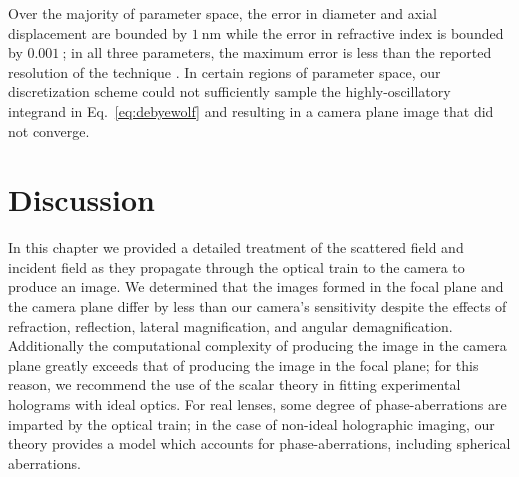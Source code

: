 Over the majority of parameter space, the error in diameter and
axial displacement are bounded by $\SI{1}{\nm}$ while the error
in refractive index is bounded by $\SI{0.001}{}$; in all three
parameters, the maximum error is less than the reported resolution of
the technique \cite{krishnatreya14}. In certain regions of parameter
space, our discretization scheme could not sufficiently sample the
highly-oscillatory integrand in Eq.~\eqref{eq:debyewolf} and
resulting in a camera plane image that did not converge.

\section{Discussion}

In this chapter we provided a detailed treatment of the scattered field
and incident field as they propagate through the optical train to the camera
to produce an image. We determined that the images formed in the focal plane
and the camera plane differ by less than our camera's sensitivity despite
the effects of refraction, reflection, lateral magnification, and angular
demagnification. Additionally the computational complexity of producing
the image in the camera plane greatly exceeds that of producing the
image in the focal plane; for this reason, we recommend the use of the
scalar theory in fitting experimental holograms with ideal optics.
For real lenses, some degree of phase-aberrations are imparted by
the optical train; in the case of non-ideal holographic imaging,
our theory provides a model which accounts for phase-aberrations,
including spherical aberrations.





